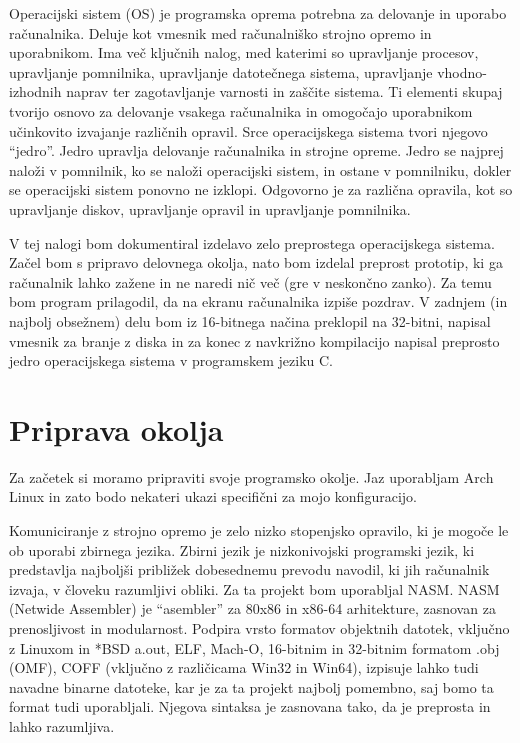 \documentclass{report}
\begin{document}
Operacijski sistem (OS) je programska oprema potrebna za delovanje in uporabo
računalnika. Deluje kot vmesnik med računalniško strojno opremo in uporabnikom.
Ima več ključnih nalog, med katerimi so upravljanje procesov, upravljanje
pomnilnika, upravljanje datotečnega sistema, upravljanje vhodno-izhodnih naprav
ter zagotavljanje varnosti in zaščite sistema. Ti elementi skupaj tvorijo osnovo
za delovanje vsakega računalnika in omogočajo uporabnikom učinkovito izvajanje
različnih opravil. Srce operacijskega sistema tvori njegovo ``jedro''. Jedro upravlja delovanje računalnika in strojne opreme. Jedro se najprej naloži v pomnilnik, ko se naloži operacijski sistem, in ostane v pomnilniku, dokler se operacijski sistem ponovno ne izklopi. Odgovorno je za različna opravila, kot so upravljanje diskov, upravljanje opravil in upravljanje pomnilnika.

V tej nalogi bom dokumentiral izdelavo zelo preprostega operacijskega sistema. Začel bom s pripravo delovnega okolja, nato bom izdelal preprost prototip, ki ga računalnik lahko zažene in ne naredi nič več (gre v neskončno zanko). Za temu bom program prilagodil, da na ekranu računalnika izpiše pozdrav. V zadnjem (in najbolj obsežnem) delu bom iz 16-bitnega načina preklopil na 32-bitni, napisal vmesnik za branje z diska in za konec z navkrižno kompilacijo napisal preprosto jedro operacijskega sistema v programskem jeziku C.

\section{Priprava okolja}
Za začetek si moramo pripraviti svoje programsko okolje. Jaz uporabljam Arch Linux in zato bodo nekateri ukazi specifični za mojo konfiguracijo.

Komuniciranje z strojno opremo je zelo nizko stopenjsko opravilo, ki je mogoče
le ob uporabi zbirnega jezika. Zbirni jezik je nizkonivojski programski jezik,
ki predstavlja najboljši približek dobesednemu prevodu navodil, ki jih
računalnik izvaja, v človeku razumljivi obliki. Za ta projekt bom uporabljal
NASM. NASM (Netwide Assembler) je ``asembler'' za 80x86 in x86-64 arhitekture, zasnovan za prenosljivost in modularnost. Podpira vrsto formatov objektnih datotek, vključno z Linuxom in *BSD a.out, ELF, Mach-O, 16-bitnim in 32-bitnim formatom .obj (OMF), COFF (vključno z različicama Win32 in Win64), izpisuje lahko tudi navadne binarne datoteke, kar je za ta projekt najbolj pomembno, saj bomo ta format tudi uporabljali. Njegova sintaksa je zasnovana tako, da je preprosta in lahko razumljiva.
\end{document}
